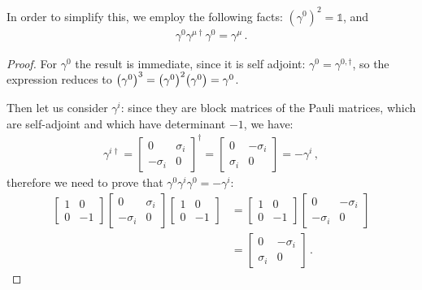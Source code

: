\documentclass[main.tex]{subfiles}
\begin{document}
In order to simplify this, we employ the following facts: \((\gamma^{0})^2 = \mathbb{1}\), and 
%
\begin{align} \label{eq:gamma-matrices-identity}
\gamma^{0} \gamma^{\mu \dag} \gamma^{0} = \gamma^{\mu }
\,.
\end{align}

\begin{proof}
For \(\gamma^{0}\) the result is immediate, since it is self adjoint: \(\gamma^{0} = \gamma^{0, \dag}\), so the expression reduces to \(\qty(\gamma^{0})^3 = \qty(\gamma^{0})^2 \qty(\gamma^{0}) = \gamma^{0}\).

Then let us consider \(\gamma^{i}\): since they are block matrices of the Pauli matrices, which are self-adjoint and which have determinant \(-1\), we have:
%
\begin{subequations}
\begin{align}
\gamma^{i \dag} = \left[\begin{array}{cc}
0 & \sigma_{i} \\ 
- \sigma_{i} & 0
\end{array}\right] ^\dag = 
\left[\begin{array}{cc}
0 & - \sigma_{i} \\ 
\sigma_{i} & 0
\end{array}\right] = - \gamma^{i}
\,,
\end{align}
\end{subequations}
%
therefore we need to prove that \(\gamma^{0} \gamma^{i} \gamma^{0} = -\gamma^{i}\): 
%
\begin{subequations}
\begin{align}
\left[\begin{array}{cc}
1 & 0 \\ 
0 & -1
\end{array}\right]
\left[\begin{array}{cc}
0 & \sigma_{i} \\ 
-\sigma_{i} & 0
\end{array}\right]
\left[\begin{array}{cc}
1 & 0 \\ 
0 & -1
\end{array}\right] &= 
\left[\begin{array}{cc}
1 & 0 \\ 
0 & -1
\end{array}\right]
\left[\begin{array}{cc}
0 & -\sigma_{i} \\ 
- \sigma_{i} & 0
\end{array}\right]  \\
&= 
\left[\begin{array}{cc}
0 & - \sigma_{i} \\ 
\sigma_{i} & 0
\end{array}\right]
\,.
\end{align}
\end{subequations}
\end{proof}
\end{document}

